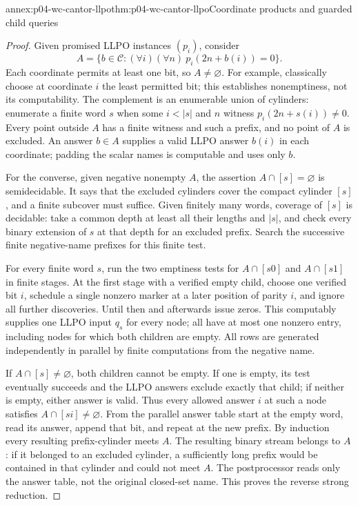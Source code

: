 \begin{annexitem}{annex:p04-wc-cantor-llpo}{thm:p04-wc-cantor-llpo}{Coordinate products and guarded child queries}
\begin{proof}
Given promised LLPO instances \((p_i)\), consider
\[
 A=\{b\in\mathcal C:(\forall i)(\forall n)\ p_i(2n+b(i))=0\}.
\]
Each coordinate permits at least one bit, so \(A\ne\varnothing\).
For example, classically choose at coordinate \(i\) the least
permitted bit; this establishes nonemptiness, not its computability.
The complement is an enumerable union of cylinders: enumerate a
finite word \(s\) when some \(i<|s|\) and \(n\) witness
\(p_i(2n+s(i))\ne0\). Every point outside \(A\) has a finite
witness and such a prefix, and no point of \(A\) is excluded.
An answer \(b\in A\) supplies a valid LLPO answer \(b(i)\) in
each coordinate; padding the scalar names is computable and uses
only \(b\).

For the converse, given negative nonempty \(A\), the assertion
\(A\cap[s]=\varnothing\) is semidecidable. It says that the
excluded cylinders cover the compact cylinder \([s]\), and a finite
subcover must suffice. Given finitely many words, coverage of \([s]\)
is decidable: take a common depth at least all their lengths and
\(|s|\), and check every binary extension of \(s\) at that depth
for an excluded prefix. Search the successive finite negative-name
prefixes for this finite test.

For every finite word \(s\), run the two emptiness tests for
\(A\cap[s0]\) and \(A\cap[s1]\) in finite stages. At the first
stage with a verified empty child, choose one verified bit \(i\),
schedule a single nonzero marker at a later position of parity \(i\),
and ignore all further discoveries. Until then and afterwards issue
zeros. This computably supplies one LLPO input \(q_s\) for every
node; all have at most one nonzero entry, including nodes for which
both children are empty. All rows are generated independently in
parallel by finite computations from the negative name.

If \(A\cap[s]\ne\varnothing\), both children cannot be empty.
If one is empty, its test eventually succeeds and the LLPO answers
exclude exactly that child; if neither is empty, either answer is
valid. Thus every allowed answer \(i\) at such a node satisfies
\(A\cap[si]\ne\varnothing\).
From the parallel answer table start at the empty word, read its
answer, append that bit, and repeat at the new prefix. By induction
every resulting prefix-cylinder meets \(A\). The resulting binary
stream belongs to \(A\): if it belonged to an excluded cylinder,
a sufficiently long prefix would be contained in that cylinder and
could not meet \(A\). The postprocessor reads only the answer table,
not the original closed-set name. This proves the reverse strong reduction.
\end{proof}
\end{annexitem}

